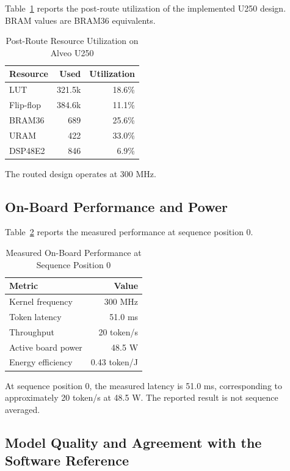 \documentclass[conference]{IEEEtran}
\newcommand{\oursLatency}    {51.0}
\newcommand{\oursThroughput} {20}
\newcommand{\oursPower}      {48.5}
\newcommand{\oursEfficiency} {0.43}
\begin{document}
Table~\ref{tab:resource} reports the post-route utilization of the implemented
U250 design. BRAM values are BRAM36 equivalents.

\begin{table}[!htbp]
\caption{Post-Route Resource Utilization on Alveo U250}
\label{tab:resource}
\centering
\scriptsize
\setlength{\tabcolsep}{8pt}
\begin{tabular}{lrr}
\toprule
Resource & Used & Utilization \\
\midrule
LUT       & 321.5k & 18.6\% \\
Flip-flop & 384.6k & 11.1\% \\
BRAM36    & 689    & 25.6\% \\
URAM      & 422    & 33.0\% \\
DSP48E2   & 846    & 6.9\% \\
\bottomrule
\end{tabular}
\end{table}

The routed design operates at 300 MHz.

\subsection{On-Board Performance and Power}

Table~\ref{tab:performance} reports the measured performance at sequence
position 0.

\begin{table}[!htbp]
\caption{Measured On-Board Performance at Sequence Position 0}
\label{tab:performance}
\centering
\scriptsize
\setlength{\tabcolsep}{3pt}
\begin{tabular}{lr}
\toprule
Metric & Value \\
\midrule
Kernel frequency & 300 MHz \\
Token latency & \oursLatency{} ms \\
Throughput & \oursThroughput{} token/s \\
Active board power & \oursPower{} W \\
Energy efficiency & \oursEfficiency{} token/J \\
\bottomrule
\end{tabular}
\end{table}

At sequence position 0, the measured latency is \oursLatency{} ms,
corresponding to approximately \oursThroughput{} token/s at \oursPower{} W. The reported
result is not sequence averaged.

\subsection{Model Quality and Agreement with the Software Reference}
\end{document}
